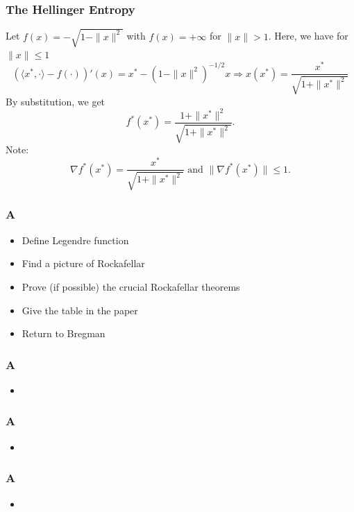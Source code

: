 \documentclass[aspectratio=169,xcolor=dvipsnames,11pt]{beamer}
\begin{document}
\begin{frame}\frametitle{The Hellinger Entropy}
\begin{example}
Let $f(x) = -\sqrt{1 - \|x\|^2}$ with $f(x) = +\infty$ for $\|x\| > 1$. Here, we have for $\|x\| \le 1$
\[ 
(\langle x^*, \cdot\rangle - f(\cdot))'(x) = x^* -  (1 - \|x\|^2)^{-1/2} x \Rightarrow x(x^*) = \frac{x^*}{\sqrt{1 + \|x^*\|^2}}
\]
By substitution, we get
\[
f^*(x^*) = \frac{1 + \|x^*\|^2}{\sqrt{1 + \|x^*\|^2}}.
\]
Note: 
\[
\nabla f^*(x^*) = \frac{x^*}{\sqrt{1 + \|x^*\|^2}} \text{ and } \| \nabla f^*(x^*) \| \le 1.
\]
\end{example}
\end{frame}

\begin{frame}\frametitle{A}
\begin{itemize}
\item Define Legendre function
\item Find a picture of Rockafellar
\item Prove (if possible) the crucial Rockafellar theorems
\item Give the table in the paper
\item Return to Bregman 
\end{itemize}
\end{frame}

\begin{frame}\frametitle{A}
\begin{itemize}
\item
\end{itemize}
\end{frame}

\begin{frame}\frametitle{A}
\begin{itemize}
\item
\end{itemize}
\end{frame}

\begin{frame}\frametitle{A}
\begin{itemize}
\item
\end{itemize}
\end{frame}
\end{document}
